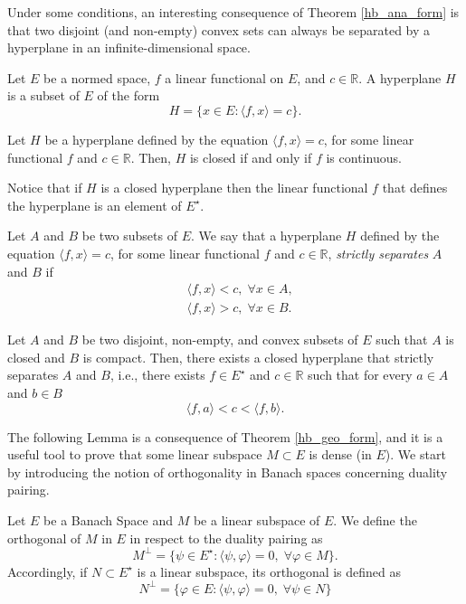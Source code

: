 Under some conditions, an interesting consequence of Theorem \ref{hb_ana_form} is that two disjoint (and non-empty) convex sets can always be separated by a hyperplane in an infinite-dimensional space.
\begin{definition}
    Let \(E\) be a normed space, \(f\) a linear functional on \(E\), and \(c \in \mathbb{R}\). A hyperplane \(H\) is a subset of \(E\) of the form
    \[
        H = \{x \in E: \langle f, x \rangle = c\}.
    \]
\end{definition}
\begin{proposition}
    Let \(H\) be a hyperplane defined by the equation \(\langle f, x \rangle = c\), for some linear functional \(f\) and \(c \in \mathbb{R}\). Then, \(H\) is closed if and only if \(f\) is continuous.
\end{proposition}
Notice that if \(H\) is a closed hyperplane then the linear functional \(f\) that defines the hyperplane is an element of \(E^\star\).
\begin{definition}
    Let \(A\) and \(B\) be two subsets of \(E\). We say that a hyperplane \(H\) defined by the equation \(\langle f, x \rangle = c\), for some linear functional \(f\) and \(c \in \mathbb{R}\), \textit{strictly separates} \(A\) and \(B\) if
    \begin{align*}
        &\langle f, x \rangle < c, \; \forall x \in A,\\
        & \langle f, x \rangle > c, \; \forall x \in B.
    \end{align*}
\end{definition}
\begin{theorem}\label{hb_geo_form}
    Let \(A\) and \(B\) be two disjoint, non-empty, and convex subsets of \(E\) such that \(A\) is closed and \(B\) is compact. Then, there exists a closed hyperplane that strictly separates \(A\) and \(B\), i.e., there exists \(f \in E^\star\) and \(c \in \mathbb{R}\) such that for every \(a \in A\) and \(b \in B\)
    \[
        \langle f, a \rangle < c < \langle f, b \rangle.
    \]
\end{theorem}
The following Lemma is a consequence of Theorem \ref{hb_geo_form}, and it is a useful tool to prove that some linear subspace \(M \subset E\) is dense (in \(E\)). We start by introducing the notion of orthogonality in Banach spaces concerning duality pairing.
\begin{definition}\label{banach_ortho_def}
    Let \(E\) be a Banach Space and \(M\) be a linear subspace of \(E\). We define the orthogonal of \(M\) in \(E\) in respect to the duality pairing as
    \[
        M^\perp = \{\psi \in E^\star: \langle \psi, \varphi \rangle = 0, \; \forall \varphi \in M\}.
    \]
    Accordingly, if \(N \subset E^\star\) is a linear subspace, its orthogonal is defined as 
    \[
        N^\perp = \{\varphi \in E: \langle \psi, \varphi \rangle = 0, \; \forall \psi \in N\}
    \]
\end{definition}
